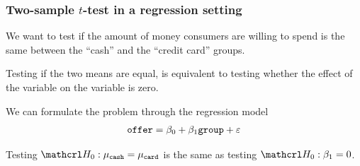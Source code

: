 \documentclass{beamer}
\begin{document}
\begin{frame}
\frametitle{Two-sample $t$-test in a regression setting}
\bi
\item We want to test if the amount of money consumers are willing to spend is the same between the ``cash'' and the ``credit card'' groups.
\item Testing if the two means are equal, is \alert{equivalent} to testing whether the effect of the variable  on the variable  is zero.
\item We can formulate the problem through the  regression model
\begin{align*}
\texttt{offer}= \beta_0 + \beta_1 \texttt{group} + \varepsilon
\end{align*}
\item  Testing $\Hy_0: \mu_{\code{cash}}=\mu_{\code{card}}$ is the same as testing $\Hy_0: \beta_1=0$.
\ei
\end{frame}
% 
% 
\end{document}
